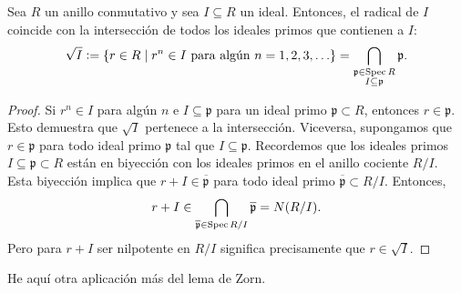 \begin{corolario}
  Sea $R$ un anillo conmutativo y sea $I \subseteq R$ un ideal. Entonces,
  el radical de $I$ coincide con la intersección de todos los ideales primos
  que contienen a $I$:
  \[ \sqrt{I} \mathrel{\mathop:}= \{ r\in R \mid r^n \in I \text{ para algún }n = 1,2,3,\ldots \} =
  \bigcap_{\substack{\mathfrak{p} \in \operatorname{Spec} R \\ I \subseteq \mathfrak{p}}} \mathfrak{p}. \]

  \begin{proof}
    Si $r^n \in I$ para algún $n$ e $I \subseteq \mathfrak{p}$ para un ideal
    primo $\mathfrak{p} \subset R$, entonces $r \in \mathfrak{p}$. Esto
    demuestra que $\sqrt{I}$ pertenece a la intersección. Viceversa, supongamos
    que $r \in \mathfrak{p}$ para todo ideal primo $\mathfrak{p}$ tal que
    $I \subseteq \mathfrak{p}$. Recordemos que los ideales primos
    $I \subseteq \mathfrak{p} \subset R$ están en biyección con los ideales
    primos en el anillo cociente $R/I$. Esta biyección implica que
    $r + I \in \overline{\mathfrak{p}}$ para todo ideal primo
    $\overline{\mathfrak{p}} \subset R/I$. Entonces,
    \[ r + I \in
       \bigcap_{\overline{\mathfrak{p}} \in \operatorname{Spec} R/I} \overline{\mathfrak{p}} =
       N (R/I).\]
     Pero para $r + I$ ser nilpotente en $R/I$ significa precisamente que
     $r \in \sqrt{I}$.
  \end{proof}
\end{corolario}

He aquí otra aplicación más del lema de Zorn.

